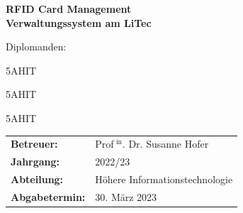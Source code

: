 \begin{titlepage}


\vspace*{3.5cm}

{
\color{litec-blue}
\noindent
\Huge\textbf{RFID Card Management}\\

\vspace{0.2cm}
\noindent
\huge\textbf{Verwaltungssystem am LiTec}
}

\vspace*{3cm}
\begin{spacing}{1.5}
\Large
\hfill Diplomanden:\\\par
\hfill\textbf{\titlePageFullNameGp}\hspace{1cm}5AHIT\par
\hfill\textbf{\titlePageFullNameMj}\hspace{1cm}5AHIT\par
\hfill\textbf{\titlePageFullNameZb}\hspace{1cm}5AHIT
\end{spacing}

\vfill

{
\hspace{-1cm}
\renewcommand{\arraystretch}{1.5}
\Large
\begin{tabular}{ll}
     \textbf{Betreuer:} & Prof$^\text{ in}$. Dr. Susanne Hofer\\
     \textbf{Jahrgang:} & 2022/23\\
     \textbf{Abteilung:} & Höhere Informationstechnologie\\
     \textbf{Abgabetermin:} & 30. März 2023
\end{tabular}
}

\end{titlepage}

